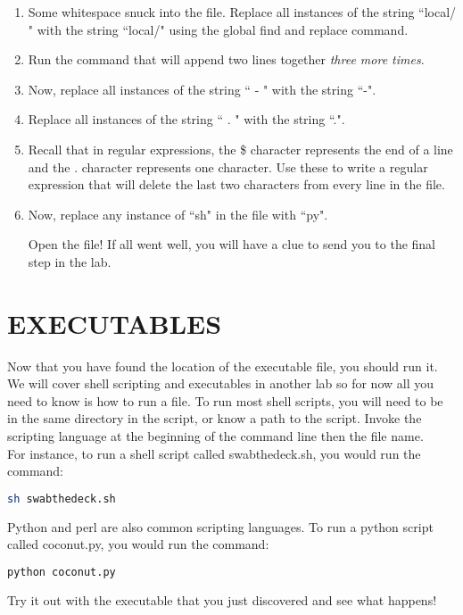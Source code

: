 \documentclass[11pt,a4paper]{article}
\begin{document}
\begin{enumerate}
\item Some whitespace snuck into the file. Replace all instances of the string ``local/ " with the string ``local/" using the global find and replace command.

\item Run the command that will append two lines together \textit{three more times}.

\item Now, replace all instances of the string `` - " with the string ``-".

\item Replace all instances of the string `` . " with the string ``.".

\item Recall that in regular expressions, the \$ character represents the end of a line and the . character represents one character. Use these to write a regular expression that will delete the last two characters from every line in the file.

\item Now, replace any instance of ``sh" in the file with ``py".

Open the file! If all went well, you will have a clue to send you to the final step in the lab.

\end{enumerate}



\pagebreak

\section{EXECUTABLES}

\indent\indent Now that you have found the location of the executable file, you should run it. We will cover shell scripting and executables in another lab so for now all you need to know is how to run a file. To run most shell scripts, you will need to be in the same directory in the script, or know a path to the script. Invoke the scripting language at the beginning of the command line then the file name. \\

For instance, to run a shell script called swabthedeck.sh, you would run the command:

\begin{lstlisting}[basicstyle=\ttfamily, backgroundcolor = \color{lightgray}, language = bash, xleftmargin = 0cm, framexleftmargin = 1em, breaklines=true]
sh swabthedeck.sh
\end{lstlisting}

Python and perl are also common scripting languages. To run a python script called coconut.py, you would run the command:

\begin{lstlisting}[basicstyle=\ttfamily, backgroundcolor = \color{lightgray}, language = bash, xleftmargin = 0cm, framexleftmargin = 1em, breaklines=true]
python coconut.py
\end{lstlisting}
          
Try it out with the executable that you just discovered and see what happens!
\end{document}
